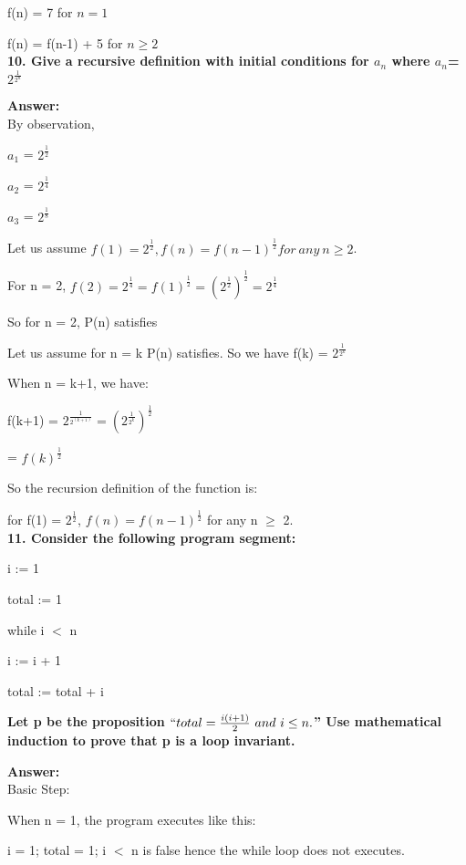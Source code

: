 \documentclass{article}
\begin{document}
\begin{large}
f(n) = 7 for $n = 1$

f(n) = f(n-1) + 5 for $n \ge 2$\\

\textbf{10. Give a recursive definition with initial conditions for {$a_{n}$} where $a_{n}$=$2^{\frac{1}{2^n}}$}

\textbf{Answer:}\\


By observation, 

$a_{1}$ = $2^{\frac {1}{2}}$

$a_{2}$ = $2^{\frac {1}{4}}$

$a_{3}$ = $2^{\frac {1}{8}}$

Let us assume $f(1) = 2^{\frac{1}{2}}, f(n) = f(n-1) ^{\frac {1}{2}} for\ any\ n \ge 2$.

For n = 2, $f(2) = 2^{\frac{1}{4}} = f(1) ^{\frac {1}{2}} = (2^{\frac{1}{2}})^{\frac{1}{2}} = 2^{\frac{1}{4}}$

So for n = 2, P(n) satisfies

Let us assume for n = k P(n) satisfies. So we have f(k) = $2^{\frac{1}{2^k}}$

When n = k+1, we have:

f(k+1) = $2^{\frac{1}{2^(k+1)}} = (2^{\frac{1}{2^k}})^{\frac{1}{2}}$

\indent\indent                             = $f(k)^{\frac{1}{2}}$

So the recursion definition of the function is: 

for f(1) = $2^{\frac{1}{2}}$, $f(n) = f(n-1) ^{\frac {1}{2}}$ for any n $\ge$ 2.\\


\textbf{11. Consider the following program segment:}

i := 1

total := 1 

while i $<$ n

\indent\indent  i := i + 1
  
\indent\indent  total := total + i

\textbf{Let p be the proposition $``total = \frac{i(i+1)}{2}\ and\ i \le n.$'' Use mathematical induction to prove that p is a loop invariant.}

\textbf{Answer:}\\

\noindent Basic Step:

 When n = 1, the program executes like this: 

  i = 1; total = 1; i $<$ n is false hence the while loop does not executes. 
  

\end{large}
\end{document}
